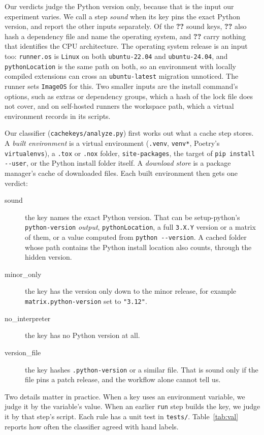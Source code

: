 \documentclass[10pt,a4paper]{article}
\newcommand{\ck}[1]{\textbf{??}}\newcommand{\repourl}{\url{https://github.com/mark124/cache-key-soundness}}%
\begin{document}
Our verdicts judge the Python version only, because that is the input our
experiment varies. We call a step \emph{sound} when its key pins the exact
Python version, and report the other inputs separately. Of the
\ck{h.sound_steps} sound keys, \ck{h.sound_with_deps_and_os} also hash a
dependency file and name the operating system, and \ck{h.sound_without_arch}
carry nothing that identifies the CPU architecture. The operating system
release is an input too: \texttt{runner.os} is \texttt{Linux} on both
\texttt{ubuntu-22.04} and \texttt{ubuntu-24.04}, and \texttt{pythonLocation}
is the same path on both, so an environment with locally compiled extensions
can cross an \texttt{ubuntu-latest} migration unnoticed. The runner sets
\texttt{ImageOS} for this. Two smaller inputs are the install command's
options, such as extras or dependency groups, which a hash of the lock file
does not cover, and on self-hosted runners the workspace path, which a
virtual environment records in its scripts.

Our classifier (\texttt{cachekeys/analyze.py}) first works out what a cache
step stores. A \emph{built environment} is a virtual environment
(\texttt{.venv}, \texttt{venv*}, Poetry's \texttt{virtualenvs}), a
\texttt{.tox} or \texttt{.nox} folder, \texttt{site-packages}, the target of
\texttt{pip install -{}-user}, or the Python install folder itself. A
\emph{download store} is a package manager's cache of downloaded files. Each
built environment then gets one verdict:
\begin{description}
\item[sound] the key names the exact Python version. That can be
  setup-python's \texttt{python-version} \emph{output}, \texttt{pythonLocation},
  a full \texttt{3.X.Y} version or a matrix of them, or a value computed from
  \texttt{python -{}-version}. A cached folder whose path contains the Python
  install location also counts, through the hidden version.
\item[minor\_only] the key has the version only down to the minor release,
  for example \texttt{matrix.python-version} set to \texttt{"3.12"}.
\item[no\_interpreter] the key has no Python version at all.
\item[version\_file] the key hashes \texttt{.python-version} or a similar
  file. That is sound only if the file pins a patch release, and the workflow
  alone cannot tell us.
\end{description}
Two details matter in practice. When a key uses an environment variable, we
judge it by the variable's value. When an earlier \texttt{run} step builds the
key, we judge it by that step's script. Each rule has a unit test in
\texttt{tests/}. Table~\ref{tab:val} reports how often the classifier agreed
with hand labels.
\end{document}

